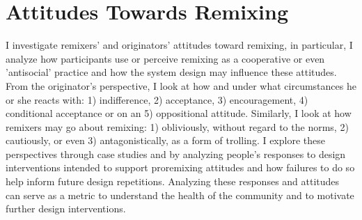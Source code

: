 \section{Attitudes Towards Remixing}

I investigate remixers' and originators' attitudes toward remixing, in particular, I analyze how participants use or perceive remixing as a cooperative or even 'antisocial' practice and how the system design may influence these attitudes. From the originator's perspective, I look at how and under what circumstances he or she reacts with: 
1) indifference, 
2) acceptance, 
3) encouragement, 
4) conditional acceptance or on an 
5) oppositional attitude. 
Similarly, I look at how remixers may go about remixing: 
1) obliviously, without regard to the norms, 
2) cautiously, or even 
3) antagonistically, as a form of trolling.
I explore these perspectives through case studies and by analyzing people's responses to design interventions intended to support proremixing attitudes and how failures to do so help inform future design repetitions. Analyzing these responses and attitudes can serve as a metric to understand the health of the community and to motivate further design interventions.


